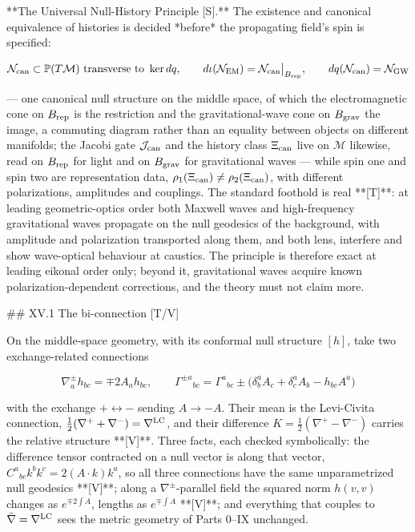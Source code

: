 **The Universal Null-History Principle [S].** The existence and canonical equivalence of histories is decided *before* the propagating field's spin is specified:

$$\mathcal N_{\rm can}\subset\mathbb P(T\mathcal M)\ \text{transverse to}\ \ker dq,\qquad d\iota(\mathcal N_{\rm EM}) = \mathcal N_{\rm can}\big|_{B_{\rm rep} },\qquad dq(\mathcal N_{\rm can}) = \mathcal N_{\rm GW}$$

— one canonical null structure on the middle space, of which the electromagnetic cone on $B_{\rm rep}$ is the restriction and the gravitational-wave cone on $B_{\rm grav}$ the image, a commuting diagram rather than an equality between objects on different manifolds; the Jacobi gate $\mathcal J_{\rm can}$ and the history class $\Xi_{\rm can}$ live on $\mathcal M$ likewise, read on $B_{\rm rep}$ for light and on $B_{\rm grav}$ for gravitational waves — while spin one and spin two are representation data, $\rho_1(\Xi_{\rm can})\neq\rho_2(\Xi_{\rm can})$, with different polarizations, amplitudes and couplings. The standard foothold is real **[T]**: at leading geometric-optics order both Maxwell waves and high-frequency gravitational waves propagate on the null geodesics of the background, with amplitude and polarization transported along them, and both lens, interfere and show wave-optical behaviour at caustics. The principle is therefore exact at leading eikonal order only; beyond it, gravitational waves acquire known polarization-dependent corrections, and the theory must not claim more.

## XV.1 The bi-connection [T/V]

On the middle-space geometry, with its conformal null structure $[h]$, take two exchange-related connections

$$\nabla^\pm_a h_{bc} = \mp2A_ah_{bc},\qquad \Gamma^{\pm a}{}_{bc} = \Gamma^a{}_{bc}\pm\big(\delta^a_bA_c+\delta^a_cA_b-h_{bc}A^a\big)$$

with the exchange $+\leftrightarrow-$ sending $A\to-A$. Their mean is the Levi-Civita connection, $\tfrac12(\nabla^++\nabla^-) = \nabla^{\rm LC}$, and their difference $K = \tfrac12(\nabla^+-\nabla^-)$ carries the relative structure **[V]**. Three facts, each checked symbolically: the difference tensor contracted on a null vector is along that vector, $C^a{}_{bc}k^bk^c = 2(A\cdot k)k^a$, so all three connections have the same unparametrized null geodesics **[V]**; along a $\nabla^\pm$-parallel field the squared norm $h(v,v)$ changes as $e^{\mp2\int A}$, lengths as $e^{\mp\int A}$ **[V]**; and everything that couples to $\bar\nabla = \nabla^{\rm LC}$ sees the metric geometry of Parts 0–IX unchanged.


